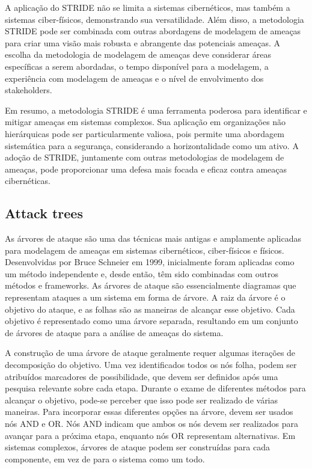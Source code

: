 A aplicação do STRIDE não se limita a sistemas cibernéticos, mas também a
sistemas ciber-físicos, demonstrando sua versatilidade. Além disso, a metodologia
STRIDE pode ser combinada com outras abordagens de modelagem de ameaças para criar
uma visão mais robusta e abrangente das potenciais ameaças. A
escolha da metodologia de modelagem de ameaças deve considerar áreas específicas a
serem abordadas, o tempo disponível para a modelagem, a experiência com modelagem de
ameaças e o nível de envolvimento dos stakeholders. 

Em resumo, a metodologia STRIDE é uma ferramenta poderosa para identificar e
mitigar ameaças em sistemas complexos. Sua aplicação em organizações não hierárquicas
pode ser particularmente valiosa, pois permite uma abordagem sistemática para a
segurança, considerando a horizontalidade como um ativo. A adoção de STRIDE, juntamente
com outras metodologias de modelagem de ameaças, pode proporcionar uma defesa mais
focada e eficaz contra ameaças cibernéticas. 

\subsection{Attack trees}
\label{sec:attack_trees}

As árvores de ataque são uma das técnicas mais antigas e amplamente aplicadas
para modelagem de ameaças em sistemas cibernéticos, ciber-físicos e físicos.
Desenvolvidas por Bruce Schneier em 1999, inicialmente foram aplicadas como um método
independente e, desde então, têm sido combinadas com outros métodos e frameworks.
As árvores de ataque são essencialmente diagramas que representam ataques a um
sistema em forma de árvore. A raiz da árvore é o objetivo do ataque, e as folhas são
as maneiras de alcançar esse objetivo. Cada objetivo é representado como uma
árvore separada, resultando em um conjunto de árvores de ataque para a análise de
ameaças do sistema. 

A construção de uma árvore de ataque geralmente requer algumas iterações de
decomposição do objetivo. Uma vez identificados todos os nós folha, podem ser atribuídos
marcadores de possibilidade, que devem ser definidos após uma pesquisa relevante sobre
cada etapa. Durante o exame de diferentes métodos para alcançar o objetivo, pode-se
perceber que isso pode ser realizado de várias maneiras. Para incorporar essas
diferentes opções na árvore, devem ser usados nós AND e OR. Nós AND indicam que ambos os
nós devem ser realizados para avançar para a próxima etapa, enquanto nós OR
representam alternativas. Em sistemas complexos, árvores de ataque
podem ser construídas para cada componente, em vez de para o sistema como um todo. 

